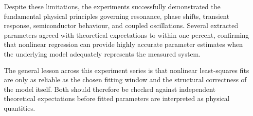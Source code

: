 \documentclass[a4paper, 10pt]{article}
\begin{document}
Despite these limitations, the experiments successfully demonstrated the
fundamental physical principles governing resonance, phase shifts,
transient response, semiconductor behaviour, and coupled oscillations.
Several extracted parameters agreed with theoretical expectations to within
one percent, confirming that nonlinear regression can provide highly
accurate parameter estimates when the underlying model adequately
represents the measured system.

The general lesson across this experiment series is that nonlinear
least-squares fits are only as reliable as the chosen fitting window and
the structural correctness of the model itself. Both should therefore be
checked against independent theoretical expectations before fitted
parameters are interpreted as physical quantities.

\printbibliography
\end{document}
